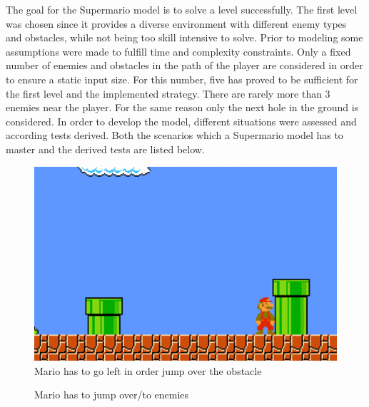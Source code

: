 The goal for the Supermario model is to solve a level successfully. The first level was chosen since it provides a diverse environment with different enemy types and obstacles, while not being too skill intensive to solve. 
Prior to modeling some assumptions were made to fulfill time and complexity constraints.
Only a fixed number of enemies and obstacles in the path of the player are considered in order to ensure a static input size. For this number, five has proved to be sufficient for the first level and the implemented strategy. There are rarely more than 3 enemies near the player. For the same reason only the next hole in the ground is considered.
In order to develop the model, different situations were assessed and according tests derived. Both the scenarios which a Supermario model has to master and the derived tests are listed below.

\begin{figure}[!h]
	\centering
	\includegraphics[scale=0.55]{pictures/Mario1.PNG}
	\caption{Mario has to go left in order jump over the obstacle}
	\label{fig:marioobstacle}
\end{figure}

\begin{figure} 
	\caption{Mario has to jump over/to enemies} 
	\label{fig:marioenemies}
\end{figure} 

